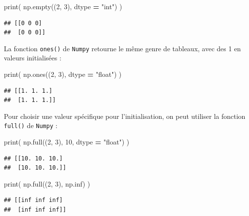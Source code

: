 \documentclass[12pt,]{book}
\newenvironment{Shaded}{\begin{snugshade}}{\end{snugshade}}
\newcommand{\DecValTok}[1]{\textcolor[rgb]{0.00,0.00,0.81}{#1}}
\newcommand{\StringTok}[1]{\textcolor[rgb]{0.31,0.60,0.02}{#1}}
\newcommand{\OperatorTok}[1]{\textcolor[rgb]{0.81,0.36,0.00}{\textbf{#1}}}
\newcommand{\BuiltInTok}[1]{#1}
\newcommand{\NormalTok}[1]{#1}
\numberwithin{equation}{section}
\numberwithin{countremarque}{section}
\begin{document}
\begin{Shaded}
\begin{Highlighting}[]
\BuiltInTok{print}\NormalTok{( np.empty((}\DecValTok{2}\NormalTok{, }\DecValTok{3}\NormalTok{), dtype }\OperatorTok{=} \StringTok{"int"}\NormalTok{) )}
\end{Highlighting}
\end{Shaded}

\begin{lstlisting}
## [[0 0 0]
##  [0 0 0]]
\end{lstlisting}

La fonction \texttt{ones()} de \texttt{Numpy} retourne le même genre de
tableaux, avec des 1 en valeurs initialisées :

\begin{Shaded}
\begin{Highlighting}[]
\BuiltInTok{print}\NormalTok{( np.ones((}\DecValTok{2}\NormalTok{, }\DecValTok{3}\NormalTok{), dtype }\OperatorTok{=} \StringTok{"float"}\NormalTok{) )}
\end{Highlighting}
\end{Shaded}

\begin{lstlisting}
## [[1. 1. 1.]
##  [1. 1. 1.]]
\end{lstlisting}

Pour choisir une valeur spécifique pour l'initialisation, on peut
utiliser la fonction \texttt{full()} de \texttt{Numpy} :

\begin{Shaded}
\begin{Highlighting}[]
\BuiltInTok{print}\NormalTok{( np.full((}\DecValTok{2}\NormalTok{, }\DecValTok{3}\NormalTok{), }\DecValTok{10}\NormalTok{, dtype }\OperatorTok{=} \StringTok{"float"}\NormalTok{) )}
\end{Highlighting}
\end{Shaded}

\begin{lstlisting}
## [[10. 10. 10.]
##  [10. 10. 10.]]
\end{lstlisting}

\begin{Shaded}
\begin{Highlighting}[]
\BuiltInTok{print}\NormalTok{( np.full((}\DecValTok{2}\NormalTok{, }\DecValTok{3}\NormalTok{), np.inf) )}
\end{Highlighting}
\end{Shaded}

\begin{lstlisting}
## [[inf inf inf]
##  [inf inf inf]]
\end{lstlisting}
\end{document}
